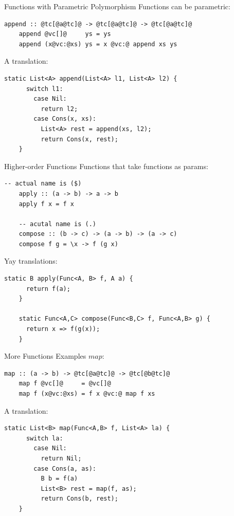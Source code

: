 \documentclass[xcolor={usenames,dvipsnames}]{beamer}
\begin{document}
\begin{frame}[fragile]{Functions with Parametric Polymorphism}
  Functions can be parametric:
  \begin{lstlisting}[style=hask]
    append :: @tc[@a@tc]@ -> @tc[@a@tc]@ -> @tc[@a@tc]@
    append @vc[]@     ys = ys
    append (x@vc:@xs) ys = x @vc:@ append xs ys
  \end{lstlisting}

  \pause
  A translation:
  \begin{lstlisting}[style=hask]
    static List<A> append(List<A> l1, List<A> l2) {
      switch l1:
        case Nil:
          return l2;
        case Cons(x, xs):
          List<A> rest = append(xs, l2);
          return Cons(x, rest);
    }
  \end{lstlisting}
\end{frame}

\begin{frame}[fragile]{Higher-order Functions}
  Functions that take functions as params:
  \begin{lstlisting}[style=hask]
    -- actual name is ($)
    apply :: (a -> b) -> a -> b
    apply f x = f x

    -- acutal name is (.)
    compose :: (b -> c) -> (a -> b) -> (a -> c)
    compose f g = \x -> f (g x)
  \end{lstlisting}

  \pause
  Yay translations:
  \begin{lstlisting}[style=hask]
    static B apply(Func<A, B> f, A a) {
      return f(a);
    }

    static Func<A,C> compose(Func<B,C> f, Func<A,B> g) {
      return x => f(g(x));
    }
  \end{lstlisting}
\end{frame}

\begin{frame}[fragile]{More Functions Examples}
  $map$:
  \begin{lstlisting}[style=hask]
    map :: (a -> b) -> @tc[@a@tc]@ -> @tc[@b@tc]@
    map f @vc[]@     = @vc[]@
    map f (x@vc:@xs) = f x @vc:@ map f xs
  \end{lstlisting}

  \pause
  A translation:
  \begin{lstlisting}[style=hask]
    static List<B> map(Func<A,B> f, List<A> la) {
      switch la:
        case Nil:
          return Nil;
        case Cons(a, as):
          B b = f(a)
          List<B> rest = map(f, as);
          return Cons(b, rest);
    }
  \end{lstlisting}
\end{frame}
\end{document}
